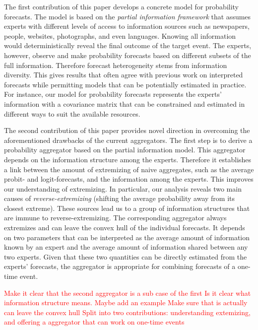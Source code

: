 \documentclass[11pt,twoside]{article}
\theoremstyle{definition}
\theoremstyle{definition}
\begin{document}

The first contribution of this paper develops a concrete model for probability forecasts. The model is based on the \textit{partial information framework} that assumes experts with different levels of access to information sources such as newspapers, people, websites, photographs, and even languages. Knowing all information would deterministically reveal the final outcome of the target event. The experts, however, observe and make probability forecasts based on different subsets of the full information. Therefore forecast heterogeneity stems from information diversity. This gives results that often agree with previous work on interpreted forecasts while permitting models that can be potentially estimated in practice. For instance, our model for probability forecasts represents  the experts' information with a covariance matrix that can be constrained and estimated in different ways to suit the available resources. 

The second contribution of this paper provides novel direction in overcoming the aforementioned drawbacks of the current aggregators. The first step is to derive a probability aggregator based on the partial information model. This aggregator depends on the information structure among the experts. Therefore it establishes a link between the amount of extremizing of naive aggregates, such as the average probit- and logit-forecasts, and the information among the experts. This improves our understanding of extremizing. In particular, our analysis reveals two main causes of \textit{reverse-extremizing} (shifting the average probability away from its closest extreme). These sources lead us to a group of information structures that are immune to reverse-extremizing. The corresponding aggregator always extremizes and can leave the convex hull of the individual forecasts. It depends on two parameters that can be interpreted as the average amount of information known by an expert and the average amount of information shared between any two experts. Given that these two quantities can be directly estimated from the experts' forecasts, the aggregator is appropriate for combining forecasts of a one-time event. 


\textcolor{red}{Make it clear that the second aggregator is a sub case of the first}
\textcolor{red}{Is it clear what information structure means. Maybe add an example}
\textcolor{red}{Make sure that is actually can leave the convex hull}
\textcolor{red}{Split into two contributions: understanding extemizing, and offering a aggregator that can work on one-time events}
\end{document}
